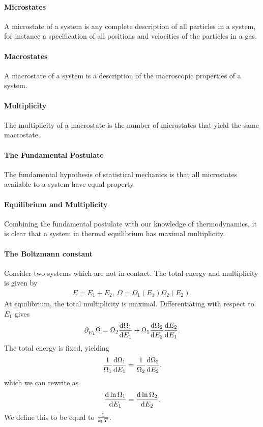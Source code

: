 \paragraph{Microstates}
A microstate of a system is any complete description of all particles in a system, for instance a specification of all positions and velocities of the particles in a gas.

\paragraph{Macrostates}
A macrostate of a system is a description of the macroscopic properties of a system.

\paragraph{Multiplicity}
The multiplicity of a macrostate is the number of microstates that yield the same macrostate.

\paragraph{The Fundamental Postulate}
The fundamental hypothesis of statistical mechanics is that all microstates available to a system have equal property.

\paragraph{Equilibrium and Multiplicity}
Combining the fundamental postulate with our knowledge of thermodynamics, it is clear that a system in thermal equilibrium has maximal multiplicity.

\paragraph{The Boltzmann constant}
Consider two systems which are not in contact. The total energy and multiplicity is given by
\begin{align*}
	E = E_{1} + E_{2},\ \Omega = \Omega_{1}(E_{1})\Omega_{2}(E_{2}).
\end{align*}
At equilibrium, the total multiplicity is maximal. Differentiating with respect to $E_{1}$ gives
\begin{align*}
	\partial_{E_{1}}^{}\Omega = \Omega_{2}\dv{\Omega_{1}}{E_{1}} + \Omega_{1}\dv{\Omega_{2}}{E_{2}}\dv{E_{2}}{E_{1}}.
\end{align*}
The total energy is fixed, yielding
\begin{align*}
	\frac{1}{\Omega_{1}}\dv{\Omega_{1}}{E_{1}} = \frac{1}{\Omega_{2}}\dv{\Omega_{2}}{E_{2}},
\end{align*}
which we can rewrite as
\begin{align*}
	\dv{\ln{\Omega_{1}}}{E_{1}} = \dv{\ln{\Omega_{2}}}{E_{2}}.
\end{align*}
We define this to be equal to $\frac{1}{k_{\text{b}} T}$.

